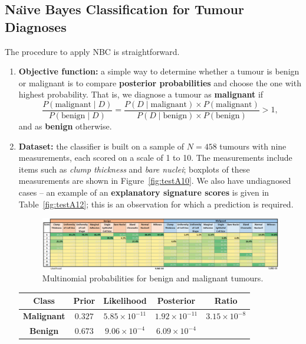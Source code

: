     \subsection{Na\"{\i}ve Bayes Classification for Tumour Diagnoses} The procedure to apply NBC is straightforward. 
\begin{enumerate}
    \item \textbf{Objective function:} a simple way to determine whether a tumour is benign or malignant is to compare \textbf{posterior probabilities} and choose the one with highest probability. That is, we diagnose a tumour as \textbf{malignant} if 
        \begin{equation*}
        \frac{P(\textrm{malignant}\mid D)}{P(\textrm{benign}\mid D)}=\frac{P(D\mid \textrm{malignant})\times P(\textrm{malignant})}{P(D\mid \textrm{benign})\times P(\textrm{benign})}>1,
    \end{equation*}
    and as \textbf{benign} otherwise. 
    
    \item \textbf{Dataset:} the classifier is built on a sample of $N=458$ tumours with nine measurements, each scored on a scale of 1 to 10. The measurements include items such as \textit{clump thickness} and \textit{bare nuclei}; boxplots of these measurements are shown in Figure~\ref{fig:testA10}. We also have undiagnosed cases -- an example of an  \textbf{explanatory signature scores} is given in Table~\ref{fig:testA12}; this is an observation for which a prediction is required.    
   
    \begin{figure}[!t]
    \centering
      \includegraphics[width=1\linewidth]{Images/testA13.png}
      \caption[\small Multinomial probabilities for benign and malignant tumours]{\small Multinomial probabilities for benign and malignant tumours.}
      \label{fig:testA13}
    \end{figure}
        \begin{table}[!t]
        \centering
        \begin{tabular}{c c c c c}
        \hline
        \textbf{Class} & \textbf{Prior} & \textbf{Likelihood} & \textbf{Posterior} & \textbf{Ratio}\\
        \hline
            \textbf{Malignant} & $0.327$ & $5.85\times 10^{-11}$ & $1.92\times 10^{-11}$ & $3.15 \times 10^{-8}$\\
        \textbf{Benign} & $0.673$ & $9.06\times 10^{-4}$ & $6.09\times 10^{-4}$ \\


\end{tabular}
\end{table}
\end{enumerate}
